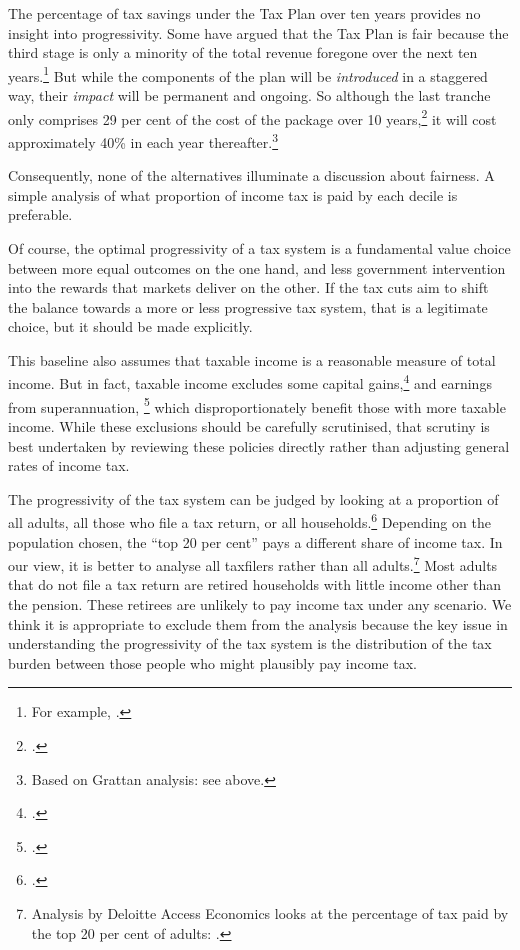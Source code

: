 \documentclass[submission]{grattan}
\begin{document}
The percentage of tax savings under the Tax Plan over ten years provides no insight into progressivity. Some have argued that the Tax Plan is fair because the third stage is only a minority of the total revenue foregone over the next ten years.\footnote{For example, \textcite{Kelly2018}.}
But while the components of the plan will be \emph{introduced} in a staggered way, their \emph{impact} will be permanent and ongoing. So although the last tranche only comprises 29 per cent of the cost of the package over 10 years,\footcite[][2]{Treasury2018c}
it will cost approximately 40\% in each year thereafter.\footnote{Based on Grattan analysis: see  above.}

Consequently, none of the alternatives illuminate a discussion about fairness. A simple analysis of what proportion of income tax is paid by each decile is preferable.

Of course, the optimal progressivity of a tax system is a fundamental value choice between more equal outcomes on the one hand, and less government intervention into the rewards that markets deliver on the other. If the tax cuts aim to shift the balance towards a more or less progressive tax system, that is a legitimate choice, but it should be made explicitly.

This baseline also assumes that taxable income is a reasonable measure of total income. But in fact, taxable income excludes some capital gains,\footcite{DaleyWood2016-Negative-Gearing-CGT} and earnings from superannuation,%
  \footcites{DaleyCoatesWood-2015-Super-tax-targeting}{Daley-etal-2016-Assessing-2016-super-tax-reforms} which disproportionately benefit those with more taxable income. While these exclusions should be carefully scrutinised, that scrutiny is best undertaken by reviewing these policies directly rather than adjusting general rates of income tax.

The progressivity of the tax system can be judged by looking at a proportion of all adults, all those who file a tax return, or all households.\footcite{Gothe}
Depending on the population chosen, the ``top 20 per cent'' pays a different share of income tax. In our view, it is better to analyse all taxfilers rather than all adults.\footnote{Analysis by Deloitte Access Economics looks at the percentage of tax paid by the top 20 per cent of adults: \textcite{Greber}.}
Most adults that do not file a tax return are retired households with little income other than the pension. These retirees are unlikely to pay income tax under any scenario. We think it is appropriate to exclude them from the analysis because the key issue in understanding the progressivity of the tax system is the distribution of the tax burden between those people who might plausibly pay income tax.
\end{document}
